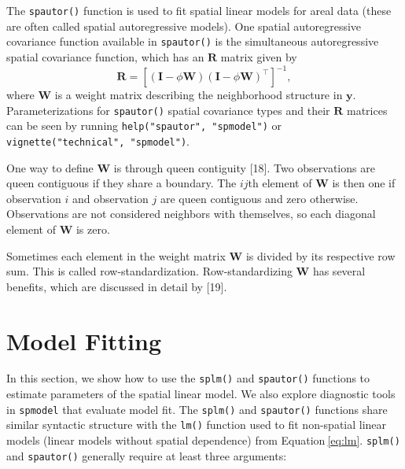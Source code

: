\documentclass[10pt,letterpaper]{article}
\begin{document}
The \texttt{spautor()} function is used to fit spatial linear models for
areal data (these are often called spatial autoregressive models). One
spatial autoregressive covariance function available in
\texttt{spautor()} is the simultaneous autoregressive spatial covariance
function, which has an \(\mathbf{R}\) matrix given by \begin{equation*}
  \mathbf{R} = [(\mathbf{I} - \phi \mathbf{W})(\mathbf{I} - \phi \mathbf{W})^\top]^{-1},
\end{equation*} where \(\mathbf{W}\) is a weight matrix describing the
neighborhood structure in \(\mathbf{y}\). Parameterizations for
\texttt{spautor()} spatial covariance types and their \(\mathbf{R}\)
matrices can be seen by running \texttt{help("spautor",\ "spmodel")} or
\texttt{vignette("technical",\ "spmodel")}.

One way to define \(\mathbf{W}\) is through queen contiguity {[}18{]}.
Two observations are queen contiguous if they share a boundary. The
\(ij\)th element of \(\mathbf{W}\) is then one if observation \(i\) and
observation \(j\) are queen contiguous and zero otherwise. Observations
are not considered neighbors with themselves, so each diagonal element
of \(\mathbf{W}\) is zero.

Sometimes each element in the weight matrix \(\mathbf{W}\) is divided by
its respective row sum. This is called row-standardization.
Row-standardizing \(\mathbf{W}\) has several benefits, which are
discussed in detail by {[}19{]}.

\hypertarget{sec:modelfit}{%
\section{Model Fitting}\label{sec:modelfit}}

In this section, we show how to use the \texttt{splm()} and
\texttt{spautor()} functions to estimate parameters of the spatial
linear model. We also explore diagnostic tools in \texttt{spmodel} that
evaluate model fit. The \texttt{splm()} and \texttt{spautor()} functions
share similar syntactic structure with the \texttt{lm()} function used
to fit non-spatial linear models (linear models without spatial
dependence) from Equation\(~\)\ref{eq:lm}. \texttt{splm()} and
\texttt{spautor()} generally require at least three arguments:
\end{document}
